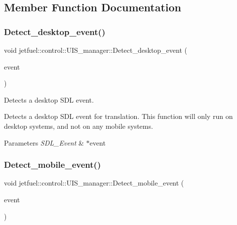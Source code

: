 \subsection{Member Function Documentation}
\mbox{\label{classjetfuel_1_1control_1_1UIS__manager_aed8de35f5209e88eda4dbb87c313420c}} 
\subsubsection{\texorpdfstring{Detect\+\_\+desktop\+\_\+event()}{Detect\_desktop\_event()}}
{\footnotesize\ttfamily void jetfuel\+::control\+::\+U\+I\+S\+\_\+manager\+::\+Detect\+\_\+desktop\+\_\+event (\begin{DoxyParamCaption}\item[{S\+D\+L\+\_\+\+Event $\ast$}]{event }\end{DoxyParamCaption})\hspace{0.3cm}{\ttfamily [protected]}}



Detects a desktop S\+DL event. 

Detects a desktop S\+DL event for translation. This function will only run on desktop systems, and not on any mobile systems.


\begin{DoxyParams}{Parameters}
{\em S\+D\+L\+\_\+\+Event} & $\ast$event \\
\hline
\end{DoxyParams}
\mbox{\label{classjetfuel_1_1control_1_1UIS__manager_a6de02ffd734406ff5187937cf951e297}} 
\subsubsection{\texorpdfstring{Detect\+\_\+mobile\+\_\+event()}{Detect\_mobile\_event()}}
{\footnotesize\ttfamily void jetfuel\+::control\+::\+U\+I\+S\+\_\+manager\+::\+Detect\+\_\+mobile\+\_\+event (\begin{DoxyParamCaption}\item[{S\+D\+L\+\_\+\+Event $\ast$}]{event }\end{DoxyParamCaption})\hspace{0.3cm}{\ttfamily [protected]}}



